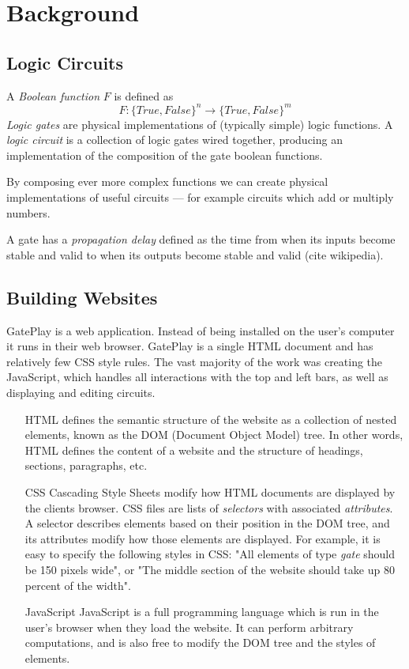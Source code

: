 \chapter{Background}
\label{chapter:background}

\section{Logic Circuits}
\label{sec:circuits}
A \textit{Boolean function} $F$ is defined as 
\[ F : \{True, False\}^n \rightarrow \{True, False\}^m \]
\textit{Logic gates} are physical implementations of (typically simple) logic functions. A \textit{logic circuit} is a collection of logic gates wired together, producing an implementation of the composition of the gate boolean functions.

By composing ever more complex functions we can create physical implementations of useful circuits --- for example circuits which add or multiply numbers.

A gate has a \textit{propagation delay} defined as the time from when its inputs become stable and valid to when its outputs become stable and valid (cite wikipedia).

\section{Building Websites}
GatePlay is a web application. Instead of being installed on the user's computer it runs in their web browser. GatePlay is a single HTML document and has relatively few CSS style rules. The vast majority of the work was creating the JavaScript, which handles all interactions with the top and left bars, as well as displaying and editing circuits.

\begin{itemize}
	\item[HTML] defines the semantic structure of the website as a collection of nested elements, known as the DOM (Document Object Model) tree. In other words, HTML defines the content of a website and the structure of headings, sections, paragraphs, etc.
	
	\item[CSS] Cascading Style Sheets modify how HTML documents are displayed by the clients browser. CSS files are lists of \textit{selectors} with associated \textit{attributes}. A selector describes elements based on their position in the DOM tree, and its attributes modify how those elements are displayed. For example, it is easy to specify the following styles in CSS: "All elements of type \textit{gate} should be 150 pixels wide", or "The middle section of the website should take up 80 percent of the width".
	
	\item[JavaScript] JavaScript is a full programming language which is run in the user's browser when they load the website. It can perform arbitrary computations, and is also free to modify the DOM tree and the styles of elements.
\end{itemize}